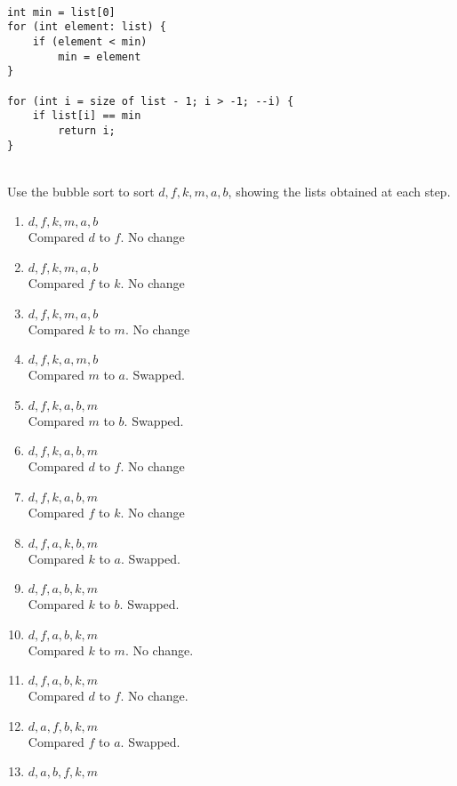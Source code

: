 \documentclass[12pt]{article}  %
\begin{document}
\\
\begin{verbatim}
int min = list[0]
for (int element: list) {
    if (element < min)
        min = element
}

for (int i = size of list - 1; i > -1; --i) {
    if list[i] == min
        return i;
}
\end{verbatim}

\\
Use the bubble sort to sort $d,f,k,m,a,b$, showing the lists obtained at each step.
\begin{enumerate}
    \item $d,f,k,m,a,b$\\
    Compared $d$ to $f$. No change
    \item $d,f,k,m,a,b$\\
    Compared $f$ to $k$. No change
    \item $d,f,k,m,a,b$\\
    Compared $k$ to $m$. No change
    \item $d,f,k,a,m,b$\\
    Compared $m$ to $a$. Swapped.
    \item $d,f,k,a,b,m$\\
    Compared $m$ to $b$. Swapped.
    \item $d,f,k,a,b,m$\\
    Compared $d$ to $f$. No change
    \item $d,f,k,a,b,m$\\
    Compared $f$ to $k$. No change
    \item $d,f,a,k,b,m$\\
    Compared $k$ to $a$. Swapped.
    \item $d,f,a,b,k,m$\\
    Compared $k$ to $b$. Swapped.
    \item $d,f,a,b,k,m$\\
    Compared $k$ to $m$. No change.
    \item $d,f,a,b,k,m$\\
    Compared $d$ to $f$. No change.
    \item $d,a,f,b,k,m$\\
    Compared $f$ to $a$. Swapped.
    \item $d,a,b,f,k,m$\\

\end{enumerate}
\end{document}
